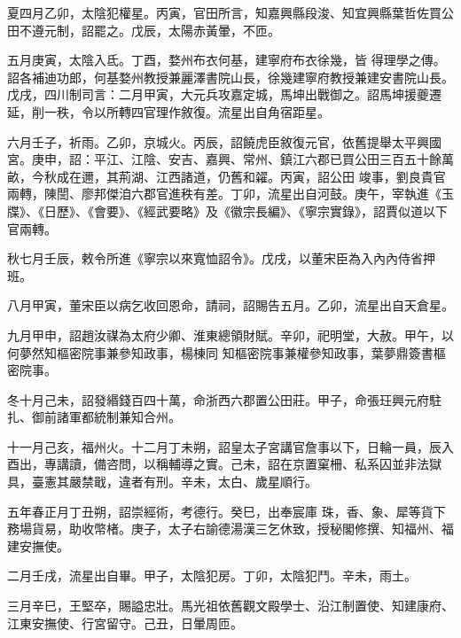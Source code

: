 \begin{pinyinscope}
 夏四月乙卯，太陰犯權星。丙寅，官田所言，知嘉興縣段浚、知宜興縣葉哲佐買公田不遵元制，詔罷之。戊辰，太陽赤黃暈，不匝。



 五月庚寅，太陰入氐。丁酉，婺州布衣何基，建寧府布衣徐幾，皆
 得理學之傳。詔各補迪功郎，何基婺州教授兼麗澤書院山長，徐幾建寧府教授兼建安書院山長。戊戌，四川制司言：二月甲寅，大元兵攻嘉定城，馬坤出戰御之。詔馬坤援夔遷延，削一秩，令以所轉四官理作敘復。流星出自角宿距星。



 六月壬子，祈雨。乙卯，京城火。丙辰，詔饒虎臣敘復元官，依舊提舉太平興國宮。庚申，詔：平江、江陰、安吉、嘉興、常州、鎮江六郡已買公田三百五十餘萬畝，今秋成在邇，其荊湖、江西諸道，仍舊和糴。丙寅，詔公田
 竣事，劉良貴官兩轉，陳誾、廖邦傑洎六郡官進秩有差。丁卯，流星出自河鼓。庚午，宰執進《玉牒》、《日歷》、《會要》、《經武要略》及《徽宗長編》、《寧宗實錄》，詔賈似道以下官兩轉。



 秋七月壬辰，敕令所進《寧宗以來寬恤詔令》。戊戌，以董宋臣為入內內侍省押班。



 八月甲寅，董宋臣以病乞收回恩命，請祠，詔賜告五月。乙卯，流星出自天倉星。



 九月甲申，詔趙汝禖為太府少卿、淮東總領財賦。辛卯，祀明堂，大赦。甲午，以何夢然知樞密院事兼參知政事，楊棟同
 知樞密院事兼權參知政事，葉夢鼎簽書樞密院事。



 冬十月己未，詔發緡錢百四十萬，命浙西六郡置公田莊。甲子，命張玨興元府駐扎、御前諸軍都統制兼知合州。



 十一月己亥，福州火。十二月丁未朔，詔皇太子宮講官詹事以下，日輪一員，辰入酉出，專講讀，備咨問，以稱輔導之實。己未，詔在京置窠柵、私系囚並非法獄具，臺憲其嚴禁戢，違者有刑。辛未，太白、歲星順行。



 五年春正月丁丑朔，詔崇經術，考德行。癸巳，出奉宸庫
 珠，香、象、犀等貨下務場貨易，助收幣楮。庚子，太子右諭德湯漢三乞休致，授秘閣修撰、知福州、福建安撫使。



 二月壬戌，流星出自畢。甲子，太陰犯房。丁卯，太陰犯鬥。辛未，雨土。



 三月辛巳，王堅卒，賜謚忠壯。馬光祖依舊觀文殿學士、沿江制置使、知建康府、江東安撫使、行宮留守。己丑，日暈周匝。




\end{pinyinscope}
